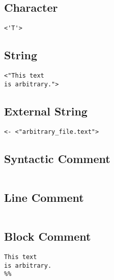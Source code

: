 \documentclass{article}
\begin{document}
\begin{multicols}
\subsection*{Character}
\begin{lstlisting}[mathescape]
<'T'>
\end{lstlisting}

\subsection*{String}
\begin{lstlisting}[mathescape]
<"This text
is arbitrary.">
\end{lstlisting}

\subsection*{External String}
\begin{lstlisting}[mathescape]
<- <"arbitrary_file.text">
\end{lstlisting}

\subsection*{Syntactic Comment}
\begin{lstlisting}[mathescape]
%$x$
\end{lstlisting}

\subsection*{Line Comment}
\begin{lstlisting}[mathescape]
% This text is arbitrary.
\end{lstlisting}

\subsection*{Block Comment}
\begin{lstlisting}[mathescape]
%%
This text
is arbitrary.
%%
\end{lstlisting}

\end{multicols}
\end{document}
